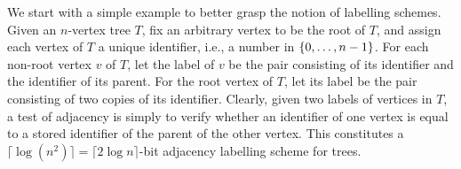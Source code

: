 \documentclass{patmorin}
\newcommand{\vida}[1]{\noindent{\color{pink} VD: #1}}
\newcommand{\cyril}[1]{\noindent\textcolor{Green}{CG: #1}}
\newcommand{\Oh}{O}
\DeclarePairedDelimiter{\set}{\{}{\}}
\begin{document}
We start with a simple example to better grasp the notion of labelling schemes. 
Given an $n$-vertex tree $T$, fix an arbitrary vertex to be the root of $T$, and assign each vertex of $T$ a unique identifier, i.e., a number in $\set{0,\ldots,n-1}$.
For each non-root vertex $v$ of $T$,
let the label of $v$ be
the pair consisting of its identifier and the identifier of its parent.
For the root vertex of $T$, let its label be
the pair consisting of two copies of its identifier.
Clearly, given two labels of vertices in $T$,
a test of adjacency is simply to verify whether an identifier of one vertex is equal to a stored identifier of the parent of the other vertex.
This constitutes a $\lceil\log(n^2)\rceil = \lceil2\log{n}\rceil$-bit adjacency labelling scheme for trees.
%
%
%
%
%
%
%
\end{document}
